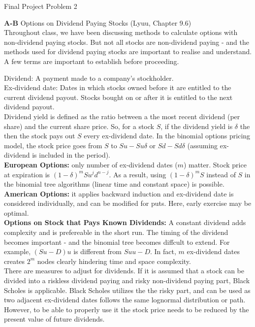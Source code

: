 \documentclass[12pt]{article}
\begin{document}
	\begin{center}
        \Large{Final Project Problem 2} 
	\end{center}
    \textbf{A-B} Options on Dividend Paying Stocks (Lyuu, Chapter 9.6) \\ 

    Throughout class, we have been discussing methods to calculate options with non-dividend paying stocks. But not all stocks are non-dividend paying - and the methods used for dividend paying stocks are important to realise and understand. A few terms are important to establish before proceeding.
   
    Dividend: A payment made to a company's stockholder. \\
Ex-dividend date: Dates in which stocks owned before it are entitled to the current dividend payout. Stocks bought on or after it is entitled to the next dividend payout. \\

    Dividend yield is defined as the ratio between a the most recent dividend (per share) and the current share price. 
    So, for a stock $S$, if the dividend yield is $\delta$ the then the stock pays out $S$ every ex-dividend date.
    In the binomial options pricing model, the stock price goes from $S$ to $Su - Su\delta$ or $Sd - Sd\delta$ (assuming ex-dividend is included in the period). \\

    \textbf{European Options:} only number of ex-dividend dates ($m$) matter. Stock price at expiration is $(1-\delta)^m Su^j d^{n-j}$. As a result, using $(1-\delta)^mS$ instead of $S$ in the binomial tree algorithms (linear time and constant space) is possible.\\

    \textbf{American Options:} it applies backward induction and ex-dividend date is considered individually, and can be modified for puts. Here, early exercise may be optimal.\\
    
    \textbf{Options on Stock that Pays Known Dividends:} A constant dividend adds complexity and is prefereable in the short run. 
    The timing of the dividend becomes important - and the binomial tree becomes diffcult to extend. For example, $(Su-D)u$ is different from $Suu-D$.
    In fact, $m$ ex-dividend dates creates $2^m$ nodes clearly hindering time and space complexity.\\ 
    

There are measures to adjust for dividends. If it is assumed that a stock can be divided into a riskless dividend paying and risky non-dividend paying part, Black Scholes is applicable.
Black Scholes utilizes the the risky part, and can be used as two adjacent ex-dividend dates follows the same lognormal distribution or path. However, to be able to properly use it the stock price needs to be reduced by the present value of future dividends.
\end{document}
